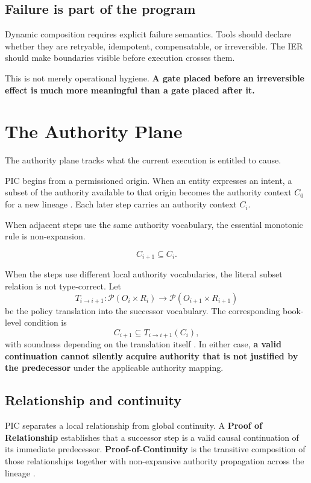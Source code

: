 \documentclass[10pt,oneside,openany]{book}
\newcommand{\term}[1]{\textbf{#1}}
\begin{document}
\section{Failure is part of the program}
Dynamic composition requires explicit failure semantics. Tools should declare whether they are retryable, idempotent, compensatable, or irreversible. The IER should make boundaries visible before execution crosses them.

This is not merely operational hygiene. \textbf{A gate placed before an irreversible effect is much more meaningful than a gate placed after it.}

\chapter{The Authority Plane}

The authority plane tracks what the current execution is entitled to cause.

PIC begins from a permissioned origin. When an entity expresses an intent, a subset of the authority available to that origin becomes the authority context \(C_0\) for a new lineage \cite{gallo2026pic}. Each later step carries an authority context \(C_i\).

When adjacent steps use the same authority vocabulary, the essential monotonic rule is non-expansion.
\begin{formulabox}
\[
C_{i+1}\subseteq C_i.
\]
\end{formulabox}
When the steps use different local authority vocabularies, the literal subset relation is not type-correct. Let
\[
T_{i\rightarrow i+1}:\mathcal{P}(O_i\times R_i)\rightarrow\mathcal{P}(O_{i+1}\times R_{i+1})
\]
be the policy translation into the successor vocabulary. The corresponding book-level condition is
\[
C_{i+1}\subseteq T_{i\rightarrow i+1}(C_i),
\]
with soundness depending on the translation itself \cite{gallo2026pic}. In either case, \textbf{a valid continuation cannot silently acquire authority that is not justified by the predecessor} under the applicable authority mapping.

\section{Relationship and continuity}
PIC separates a local relationship from global continuity. A \term{Proof of Relationship} establishes that a successor step is a valid causal continuation of its immediate predecessor. \term{Proof-of-Continuity} is the transitive composition of those relationships together with non-expansive authority propagation across the lineage \cite{gallo2026pic}.
\end{document}
